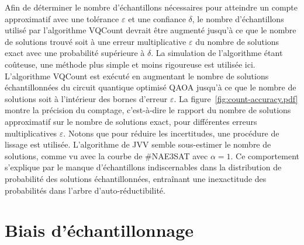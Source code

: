 Afin de déterminer le nombre d'échantillons nécessaires pour atteindre un compte approximatif avec une tolérance $\varepsilon$ et une confiance $\delta$, le nombre d'échantillons utilisé par l'algorithme VQCount devrait être augmenté jusqu'à ce que le nombre de solutions trouvé soit à une erreur multiplicative $\varepsilon$ du nombre de solutions exact avec une probabilité supérieure à $\delta$. La simulation de l'algorithme étant coûteuse, une méthode plus simple et moins rigoureuse est utilisée ici. L'algorithme VQCount est exécuté en augmentant le nombre de solutions échantillonnées du circuit quantique optimisé QAOA jusqu'à ce que le nombre de solutions soit à l'intérieur des bornes d'erreur $\varepsilon$. La figure~\ref{fig:count-accuracy.pdf} montre la précision du comptage, c'est-à-dire le rapport du nombre de solutions approximatif sur le nombre de solutions exact, pour différentes erreurs multiplicatives $\varepsilon$. Notons que pour réduire les incertitudes, une procédure de lissage est utilisée. L'algorithme de JVV semble sous-estimer le nombre de solutions, comme vu avec la courbe de \#NAE3SAT avec $\alpha = 1$. Ce comportement s'explique par le manque d'échantillons indiscernables dans la distribution de probabilité des solutions échantillonnées, entraînant une inexactitude des probabilités dans l'arbre d'auto-réductibilité. 


\section{Biais d'échantillonnage}
\label{sec:biais-echantillonnage}

